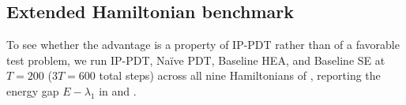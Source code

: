 \documentclass[11pt]{article}
\theoremstyle{plain}
\theoremstyle{plain}
\begin{document}



\subsection{Extended Hamiltonian benchmark}\label{sec:exp_extended}
To see whether
the advantage is a property of IP-PDT rather than of a favorable test
problem, we run IP-PDT, Na\"ive PDT, Baseline HEA, and Baseline SE at
$T = 200$ ($3T = 600$ total steps) across all nine Hamiltonians of
, reporting the energy gap $E-\lambda_1$ in
 and .
\end{document}
